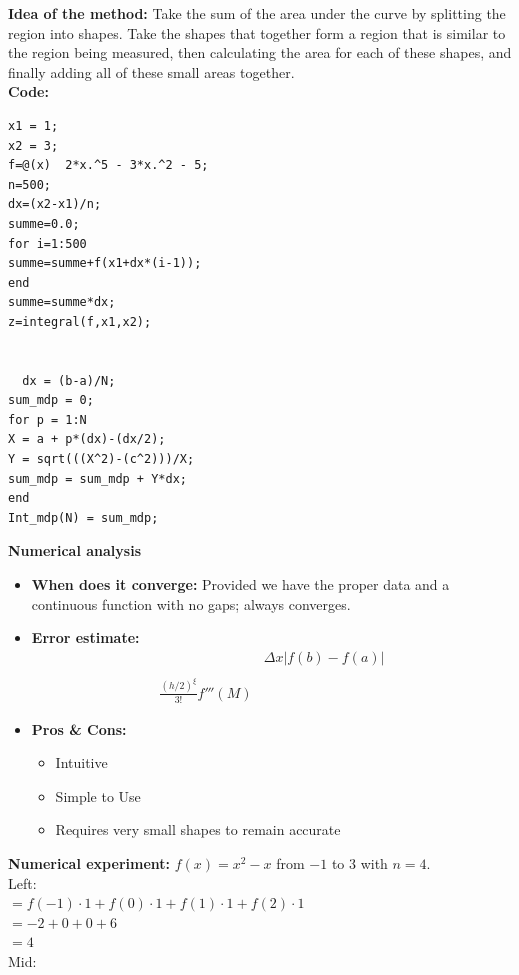 \documentclass{article}
\begin{document}
{\bf Idea of the method:} 
Take the sum of the area under the curve by splitting the region into shapes. Take the shapes that together form a region that is similar to the region being measured, then calculating the area for each of these shapes, and finally adding all of these small areas together. 
{\\\bf Code:}
\begin{verbatim}
x1 = 1;
x2 = 3;
f=@(x)  2*x.^5 - 3*x.^2 - 5;
n=500;
dx=(x2-x1)/n;
summe=0.0;
for i=1:500
summe=summe+f(x1+dx*(i-1));
end
summe=summe*dx;
z=integral(f,x1,x2);


  dx = (b-a)/N;
sum_mdp = 0;
for p = 1:N
X = a + p*(dx)-(dx/2); 
Y = sqrt(((X^2)-(c^2)))/X;
sum_mdp = sum_mdp + Y*dx;      
end
Int_mdp(N) = sum_mdp;

\end{verbatim}
{\bf Numerical analysis}
\begin{itemize}
	\item{\bf When does it converge:} Provided we have the proper data and a continuous function with no gaps; always converges.
	\item {\bf Error estimate:}
	\begin{equation}
	\begin{split}
	&\Delta x | f ( b ) - f ( a ) |\\
	\\
	\frac{(h/2)^\xi}{3!}f'''(M)
	\end{split}
	\end{equation}
	\item {\bf Pros \& Cons:}
	\begin{itemize}
		\item Intuitive
		\item Simple to Use
		\item Requires very small shapes to remain accurate
	\end{itemize}
\end{itemize}
{\bf Numerical experiment:}
$ f(x)=x^2-x $ from $ -1$ to 3 with $ n=4 $.\\
Left:\\
$= f ( - 1 ) \cdot 1 + f ( 0 ) \cdot 1 + f ( 1 ) \cdot 1 + f ( 2 ) \cdot 1$\\
$= - 2 + 0 + 0 + 6$\\
$= 4$\\
Mid:\\
\end{document}
